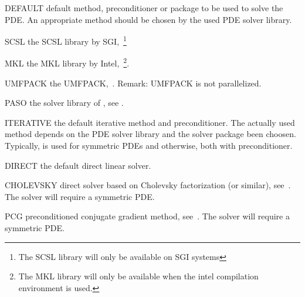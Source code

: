 \begin{memberdesc}[LinearPDE]{DEFAULT}
default method, preconditioner or package to be used to solve the PDE. An appropriate method should be 
chosen by the used PDE solver library.
\end{memberdesc}

\begin{memberdesc}[LinearPDE]{SCSL}
the SCSL library by SGI,~\footnote{The SCSL library will only be available on SGI systems} 
\end{memberdesc}

\begin{memberdesc}[LinearPDE]{MKL}
the MKL library by Intel,~\footnote{The MKL library will only be available when the intel compilation environment is used.}.
\end{memberdesc}

\begin{memberdesc}[LinearPDE]{UMFPACK}
the UMFPACK,~. Remark: UMFPACK is not parallelized.
\end{memberdesc}

\begin{memberdesc}[LinearPDE]{PASO}
the solver library of \finley, see .
\end{memberdesc}

\begin{memberdesc}[LinearPDE]{ITERATIVE}
the default iterative method and preconditioner. The actually used method depends on the
PDE solver library and the solver package been choosen. Typically, \PCG is used for symmetric PDEs 
and \BiCGStab otherwise, both with \JACOBI preconditioner. 
\end{memberdesc}

\begin{memberdesc}[LinearPDE]{DIRECT}
the default direct linear solver. 
\end{memberdesc}

\begin{memberdesc}[LinearPDE]{CHOLEVSKY}
direct solver based on Cholevsky factorization (or similar), see~. The solver will require a symmetric PDE. 
\end{memberdesc}

\begin{memberdesc}[LinearPDE]{PCG}
preconditioned conjugate gradient method, see~. The solver will require a symmetric PDE.
\end{memberdesc}

